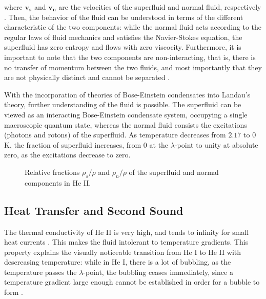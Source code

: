 where $\mathbf{v_s}$ and $\mathbf{v_n}$ are the velocities of the
superfluid and normal fluid, respectively \cite{tilley}. Then, the
behavior of the fluid can be understood in terms of the different
characteristic of the two components: while the normal fluid acts
according to the regular laws of fluid mechanics and satisfies the
Navier-Stokes equation, the superfluid has zero entropy and flows with
zero viscocity. Furthermore, it is important to note that the two
components are non-interacting, that is, there is no transfer of
momentum between the two fluids, and most importantly that they are
not physically distinct and cannot be separated \cite{tilley}.

With the incorporation of theories of Bose-Einstein condensates into
Landau's theory, further understanding of the fluid is possible. The
superfluid can be viewed as an interacting Bose-Einstein condensate
system, occupying a single macroscopic quantum state, whereas the
normal fluid consists the excitations (photons and rotons) of the
superfluid. As temperature decreases from $2.17$ to $0$ K, the
fraction of superfluid increases, from $0$ at the $\lambda$-point to
unity at absolute zero, as the excitations decrease to zero.

\begin{figure}[ht]
\begin{center}

\caption{\small{Relative fractions $\rho_s/\rho$ and $\rho_n/\rho$ of
    the superfluid and normal components in He II.}}
\label{figure:twofluid}
\end{center}
\end{figure}



\subsection{Heat Transfer and Second Sound}

The thermal conductivity of He II is very high, and tends to infinity
for small heat currents \cite{tilley}. This makes the fluid intolerant
to temperature gradients. This property explains the visually
noticeable transition from He I to He II with descreasing temperature:
while in He I, there is a lot of bubbling, as the temperature passes
the $\lambda$-point, the bubbling ceases immediately, since a
temperature gradient large enough cannot be established in order for a
bubble to form \cite{tilley}.


